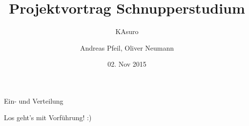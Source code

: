 \documentclass[t]{beamer}
\date{02. Nov 2015}
\title{Projektvortrag Schnupperstudium}
\subtitle{KAsuro}
\author{Andreas Pfeil, Oliver Neumann}
\begin{document}
\begin{frame}
\maketitle
\end{frame}

 




\begin{frame}[c]
	\centering \Huge Ein- und Verteilung
\end{frame}

\begin{frame}[c]
	\centering \Huge Los geht's mit Vorführung! :)
\end{frame}
\end{document}
